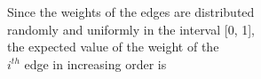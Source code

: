 \documentclass[preview]{standalone}
\begin{document}
\begin{center}
Since the weights of the edges are distributed\\ randomly and uniformly in the interval [0, 1], \\the expected value of the weight of the \\$i^{th}$ edge in increasing order is
\end{center}
\end{document}
